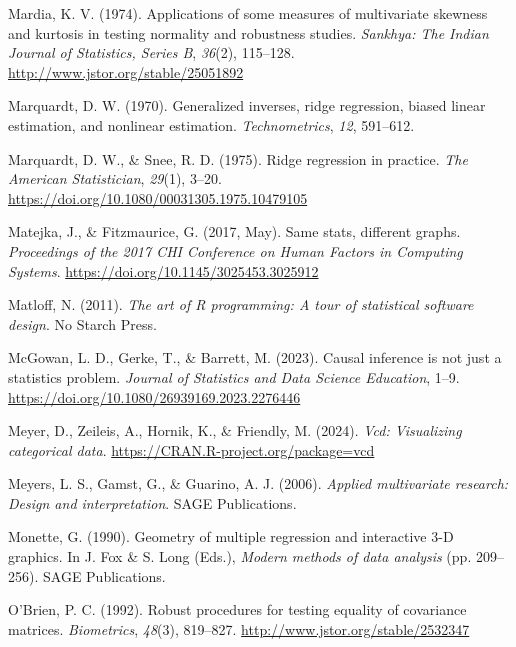 \documentclass[
  letterpaper,
  10pt,
  krantz2]{krantz}
\newlength{\cslhangindent}
\newenvironment{CSLReferences}[2] %
 {\begin{list}{}{%
  \setlength{\itemindent}{0pt}
  \setlength{\leftmargin}{0pt}
  \setlength{\parsep}{0pt}
  \ifodd #1
   \setlength{\leftmargin}{\cslhangindent}
   \setlength{\itemindent}{-1\cslhangindent}
  \fi
  \setlength{\itemsep}{#2\baselineskip}}}
 {\end{list}}
\begin{document}
\begin{CSLReferences}{1}{0}
Mardia, K. V. (1974). Applications of some measures of multivariate
skewness and kurtosis in testing normality and robustness studies.
\emph{Sankhya: The Indian Journal of Statistics, Series B},
\emph{36}(2), 115--128. \url{http://www.jstor.org/stable/25051892}

Marquardt, D. W. (1970). Generalized inverses, ridge regression, biased
linear estimation, and nonlinear estimation. \emph{Technometrics},
\emph{12}, 591--612.

Marquardt, D. W., \& Snee, R. D. (1975). Ridge regression in practice.
\emph{The American Statistician}, \emph{29}(1), 3--20.
\url{https://doi.org/10.1080/00031305.1975.10479105}

Matejka, J., \& Fitzmaurice, G. (2017, May). Same stats, different
graphs. \emph{Proceedings of the 2017 {CHI} Conference on Human Factors
in Computing Systems}. \url{https://doi.org/10.1145/3025453.3025912}

Matloff, N. (2011). \emph{The art of {R} programming: {A} tour of
statistical software design}. No Starch Press.

McGowan, L. D., Gerke, T., \& Barrett, M. (2023). Causal inference is
not just a statistics problem. \emph{Journal of Statistics and Data
Science Education}, 1--9.
\url{https://doi.org/10.1080/26939169.2023.2276446}

Meyer, D., Zeileis, A., Hornik, K., \& Friendly, M. (2024). \emph{Vcd:
Visualizing categorical data}.
\url{https://CRAN.R-project.org/package=vcd}

Meyers, L. S., Gamst, G., \& Guarino, A. J. (2006). \emph{Applied
multivariate research: Design and interpretation}. SAGE Publications.

Monette, G. (1990). Geometry of multiple regression and interactive
3-{D} graphics. In J. Fox \& S. Long (Eds.), \emph{Modern methods of
data analysis} (pp. 209--256). SAGE Publications.

O'Brien, P. C. (1992). Robust procedures for testing equality of
covariance matrices. \emph{Biometrics}, \emph{48}(3), 819--827.
\url{http://www.jstor.org/stable/2532347}


\end{CSLReferences}
\end{document}
